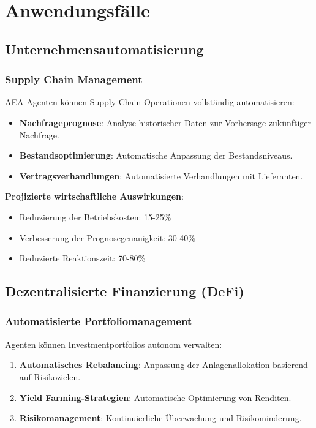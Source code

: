\documentclass[12pt,a4paper]{article}
\begin{document}
\section{Anwendungsfälle}

\subsection{Unternehmensautomatisierung}

\subsubsection{Supply Chain Management}

AEA-Agenten können Supply Chain-Operationen vollständig automatisieren:

\begin{itemize}
\item \textbf{Nachfrageprognose}: Analyse historischer Daten zur Vorhersage zukünftiger Nachfrage.
\item \textbf{Bestandsoptimierung}: Automatische Anpassung der Bestandsniveaus.
\item \textbf{Vertragsverhandlungen}: Automatisierte Verhandlungen mit Lieferanten.
\end{itemize}

\textbf{Projizierte wirtschaftliche Auswirkungen}:
\begin{itemize}
\item Reduzierung der Betriebskosten: 15-25\%
\item Verbesserung der Prognosegenauigkeit: 30-40\%
\item Reduzierte Reaktionszeit: 70-80\%
\end{itemize}

\subsection{Dezentralisierte Finanzierung (DeFi)}

\subsubsection{Automatisierte Portfoliomanagement}

Agenten können Investmentportfolios autonom verwalten:

\begin{enumerate}
\item \textbf{Automatisches Rebalancing}: Anpassung der Anlagenallokation basierend auf Risikozielen.
\item \textbf{Yield Farming-Strategien}: Automatische Optimierung von Renditen.
\item \textbf{Risikomanagement}: Kontinuierliche Überwachung und Risikominderung.
\end{enumerate}
\end{document}
